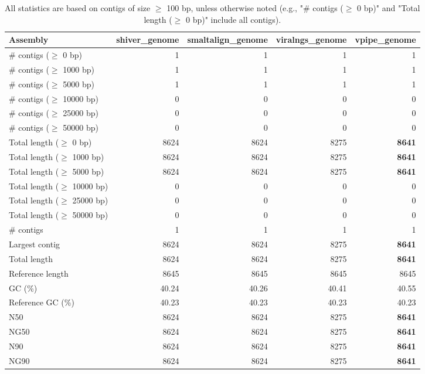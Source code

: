 \documentclass[12pt,a4paper]{article}
\begin{document}
\begin{table}[ht]
\begin{center}
\caption{All statistics are based on contigs of size $\geq$ 100 bp, unless otherwise noted (e.g., "\# contigs ($\geq$ 0 bp)" and "Total length ($\geq$ 0 bp)" include all contigs).}
\begin{tabular}{|l*{4}{|r}|}
\hline
Assembly & shiver\_genome & smaltalign\_genome & viralngs\_genome & vpipe\_genome \\ \hline
\# contigs ($\geq$ 0 bp) & 1 & 1 & 1 & 1 \\ \hline
\# contigs ($\geq$ 1000 bp) & 1 & 1 & 1 & 1 \\ \hline
\# contigs ($\geq$ 5000 bp) & 1 & 1 & 1 & 1 \\ \hline
\# contigs ($\geq$ 10000 bp) & 0 & 0 & 0 & 0 \\ \hline
\# contigs ($\geq$ 25000 bp) & 0 & 0 & 0 & 0 \\ \hline
\# contigs ($\geq$ 50000 bp) & 0 & 0 & 0 & 0 \\ \hline
Total length ($\geq$ 0 bp) & 8624 & 8624 & 8275 & {\bf 8641} \\ \hline
Total length ($\geq$ 1000 bp) & 8624 & 8624 & 8275 & {\bf 8641} \\ \hline
Total length ($\geq$ 5000 bp) & 8624 & 8624 & 8275 & {\bf 8641} \\ \hline
Total length ($\geq$ 10000 bp) & 0 & 0 & 0 & 0 \\ \hline
Total length ($\geq$ 25000 bp) & 0 & 0 & 0 & 0 \\ \hline
Total length ($\geq$ 50000 bp) & 0 & 0 & 0 & 0 \\ \hline
\# contigs & 1 & 1 & 1 & 1 \\ \hline
Largest contig & 8624 & 8624 & 8275 & {\bf 8641} \\ \hline
Total length & 8624 & 8624 & 8275 & {\bf 8641} \\ \hline
Reference length & 8645 & 8645 & 8645 & 8645 \\ \hline
GC (\%) & 40.24 & 40.26 & 40.41 & 40.55 \\ \hline
Reference GC (\%) & 40.23 & 40.23 & 40.23 & 40.23 \\ \hline
N50 & 8624 & 8624 & 8275 & {\bf 8641} \\ \hline
NG50 & 8624 & 8624 & 8275 & {\bf 8641} \\ \hline
N90 & 8624 & 8624 & 8275 & {\bf 8641} \\ \hline
NG90 & 8624 & 8624 & 8275 & {\bf 8641} \\ \hline

\end{tabular}
\end{center}
\end{table}
\end{document}
